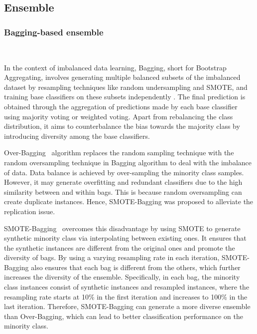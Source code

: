 \subsection{Ensemble}
\label{s34}

\subsubsection{Bagging-based ensemble}\
\label{s341}

 
In the context of imbalanced data learning, Bagging, short for Bootstrap Aggregating, involves generating multiple balanced subsets of the imbalanced dataset by resampling techniques like random undersampling and SMOTE, and training base classifiers on these subsets independently \cite{breiman1996bagging}. The final prediction is obtained through the aggregation of predictions made by each base classifier using majority voting or weighted voting. Apart from rebalancing the class distribution, it aims to counterbalance the bias towards the majority class by introducing diversity among the base classifiers.

Over-Bagging~\cite{ref_22} algorithm replaces the random sampling technique with the random oversampling technique in Bagging algorithm to deal with the imbalance of data. Data balance is achieved by over-sampling the minority class samples. However, it may generate overfitting and redundant classifiers due to the high similarity between and within bags. This is because random oversampling can create duplicate instances. Hence, SMOTE-Bagging was proposed to alleviate the replication issue. 

SMOTE-Bagging~\cite{ref_22} overcomes this disadvantage by using SMOTE to generate synthetic minority class via interpolating between existing ones. It ensures that the synthetic instances are different from the original ones and promote the diversity of bags. By using a varying resampling rate in each iteration, SMOTE-Bagging also ensures that each bag is different from the others, which further increases the diversity of the ensemble. Specifically, in each bag, the minority class instances consist of synthetic instances and resampled instances, where the resampling rate starts at 10\% in the first iteration and increases to 100\% in the last iteration. Therefore, SMOTE-Bagging can generate a more diverse ensemble than Over-Bagging, which can lead to better classification performance on the minority class.


